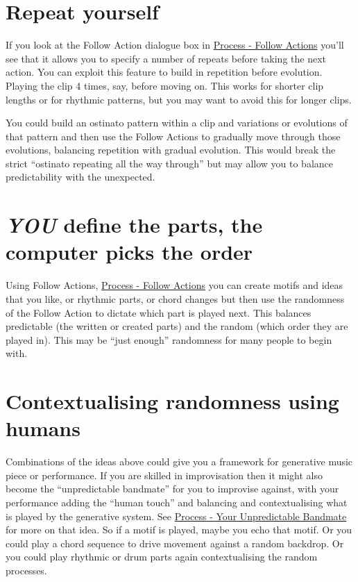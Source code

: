 \documentclass[
  12pt,
  letterpaper,
  oneside,
  open=any]{scrbook}
\begin{document}
\section{Repeat yourself}\label{repeat-yourself}

If you look at the Follow Action dialogue box in
\hyperref[Chapter-003-Process-Follow_Actions]{Process - Follow Actions}
you'll see that it allows you to specify a number of repeats before
taking the next action. You can exploit this feature to build in
repetition before evolution. Playing the clip 4 times, say, before
moving on. This works for shorter clip lengths or for rhythmic patterns,
but you may want to avoid this for longer clips.

You could build an ostinato pattern within a clip and variations or
evolutions of that pattern and then use the Follow Actions to gradually
move through those evolutions, balancing repetition with gradual
evolution. This would break the strict ``ostinato repeating all the way
through'' but may allow you to balance predictability with the
unexpected.

\section{\texorpdfstring{\textbf{\emph{YOU}} define the parts, the
computer picks the
order}{YOU define the parts, the computer picks the order}}\label{you-define-the-parts-the-computer-picks-the-order}

Using Follow Actions,
\hyperref[Chapter-003-Process-Follow_Actions]{Process - Follow Actions}
you can create motifs and ideas that you like, or rhythmic parts, or
chord changes but then use the randomness of the Follow Action to
dictate which part is played next. This balances predictable (the
written or created parts) and the random (which order they are played
in). This may be ``just enough'' randomness for many people to begin
with.

\section{Contextualising randomness using
humans}\label{contextualising-randomness-using-humans}

Combinations of the ideas above could give you a framework for
generative music piece or performance. If you are skilled in
improvisation then it might also become the ``unpredictable bandmate''
for you to improvise against, with your performance adding the ``human
touch'' and balancing and contextualising what is played by the
generative system. See
\hyperref[Chapter-023-Process-Your_Unpredictable_Bandmate]{Process -
Your Unpredictable Bandmate} for more on that idea. So if a motif is
played, maybe you echo that motif. Or you could play a chord sequence to
drive movement against a random backdrop. Or you could play rhythmic or
drum parts again contextualising the random processes.
\end{document}
